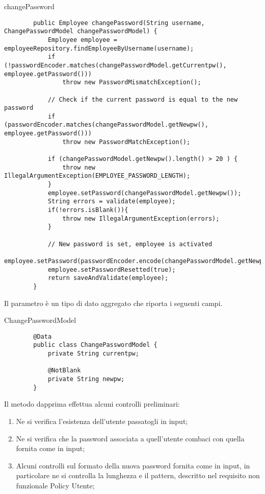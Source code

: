 \begin{elsrc}{changePassword}
	\begin{verbatim}
		public Employee changePassword(String username, ChangePasswordModel changePasswordModel) {
			Employee employee = employeeRepository.findEmployeeByUsername(username);
			if (!passwordEncoder.matches(changePasswordModel.getCurrentpw(), employee.getPassword()))
				throw new PasswordMismatchException();

			// Check if the current password is equal to the new password
			if (passwordEncoder.matches(changePasswordModel.getNewpw(), employee.getPassword()))
				throw new PasswordMatchException();

			if (changePasswordModel.getNewpw().length() > 20 ) {
				throw new IllegalArgumentException(EMPLOYEE_PASSWORD_LENGTH);
			}
			employee.setPassword(changePasswordModel.getNewpw());
			String errors = validate(employee);
			if(!errors.isBlank()){
				throw new IllegalArgumentException(errors);
			}

			// New password is set, employee is activated
			employee.setPassword(passwordEncoder.encode(changePasswordModel.getNewpw()));
			employee.setPasswordResetted(true);
			return saveAndValidate(employee);
		}
	\end{verbatim}
\end{elsrc}

Il parametro  è un tipo di dato aggregato che riporta
i seguenti campi.
\begin{elsrc}{ChangePasswordModel}
	\begin{verbatim}
		@Data
		public class ChangePasswordModel {
			private String currentpw;

			@NotBlank
			private String newpw;
		}
	\end{verbatim}
\end{elsrc}

Il metodo dapprima effettua alcuni controlli preliminari:
\begin{enumerate}
	\item Ne si verifica l'esistenza dell'utente passatogli in input;
	\item Ne si verifica che la password associata a quell'utente combaci con quella fornita come  in input; 
	\item Alcuni controlli sul formato della nuova password fornita come  in input, in particolare
	ne si controlla la lunghezza e il pattern, descritto nel requisito non funzionale Policy Utente;
\end{enumerate}

